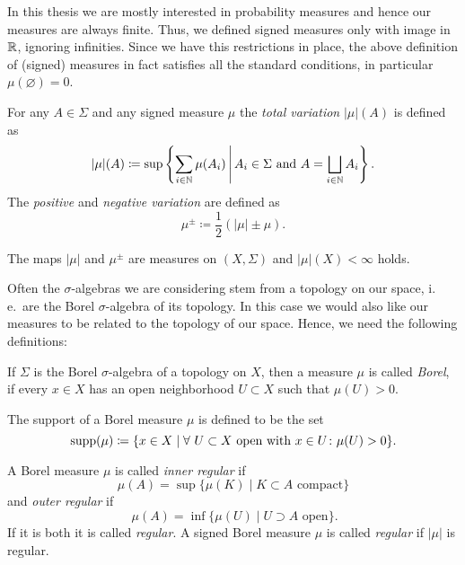 \begin{rem}
  In this thesis we are mostly interested in probability measures and hence our measures are always finite. Thus, we defined signed measures only with image in \(\mathbb{R}\), ignoring infinities. Since we have this restrictions in place, the above definition of (signed) measures in fact satisfies all the standard conditions, in particular \(\mu(\varnothing) = 0\).
\end{rem}

\begin{defin}
    For any \(A \in \Sigma\) and any signed measure \(\mu\) the \emph{total variation} \(|\mu|(A)\) is defined as
  \[
    |\mu|(A) \coloneqq \sup \left\{\sum_{i \in \mathbb{N}} \mu(A_i) \,\middle|\, A_i \in \Sigma \text{ and } A = \bigsqcup_{i \in \mathbb{N}} A_i \right \}.
  \]
  The \emph{positive} and \emph{negative variation} are defined as
  \[
    \mu^\pm \coloneqq \frac12 (|\mu| \pm \mu).
  \]
\end{defin}

\begin{prop}
  The maps \(|\mu|\) and \(\mu^\pm\) are measures on \((X, \Sigma)\) and \(|\mu|(X) < \infty\) holds.
\end{prop}

Often the \(\sigma\)-algebras we are considering stem from a topology on our space, i.\,e.\ are the Borel \(\sigma\)-algebra of its topology. In this case we would also like our measures to be related to the topology of our space. Hence, we need the following definitions:

\begin{defin}
  If \(\Sigma\) is the Borel \(\sigma\)-algebra of a topology on \(X\), then a measure \(\mu\) is called \emph{Borel}, if every \(x \in X\) has an open neighborhood \(U \subset X\) such that \(\mu(U) > 0\).

  The support of a Borel measure \(\mu\) is defined to be the set
  \[
    \operatorname{supp}(\mu) \coloneqq \{x \in X \mid \forall\ U \subset X \text{ open with } x \in U\colon \mu(U) > 0\}.
  \]
\end{defin}

\begin{defin}
  A Borel measure \(\mu\) is called \emph{inner regular} if
  \[
    \mu(A) = \sup \{ \mu(K) \mid K \subset A \text{ compact}\}
  \]
  and \emph{outer regular} if
  \[\
    \mu(A) = \inf \{ \mu(U) \mid U \supset A \text{ open}\}.
  \]
  If it is both it is called \emph{regular}. A signed Borel measure \(\mu\) is called \emph{regular} if \(|\mu|\) is regular.
\end{defin}

